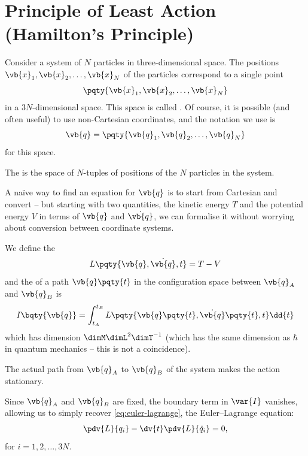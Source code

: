 \section{Principle of Least Action (Hamilton's Principle)}

Consider a system of \(N\) particles in three-dimensional space. The positions \(\vb{x}_1, \vb{x}_2, \ldots, \vb{x}_N\) of the particles correspond to a single point
\[
    \pqty{\vb{x}_1, \vb{x}_2, \ldots, \vb{x}_N}
\]
in a \(3N\)-dimensional space. This space is called . Of course, it is possible (and often useful) to use non-Cartesian coordinates, and the notation we use is
\[
    \vb{q} = \pqty{\vb{q}_1, \vb{q}_2, \ldots, \vb{q}_N}
\]
for this space.

\begin{definition}
    The  is the space of \(N\)-tuples of positions of the \(N\) particles in the system.
\end{definition}

A na\"ive way to find an equation for \(\vb{q}\) is to start from Cartesian and convert -- but starting with two quantities, the kinetic energy \(T\) and the potential energy \(V\) in terms of \(\vb{q}\) and \(\dot{\vb{q}}\), we can formalise it without worrying about conversion between coordinate systems.

\begin{definition}
    We define the 
    \begin{equation}
        \label{eq:lagrangian}%
        L \pqty{\vb{q}, \dot{\vb{q}}, t} = T - V
    \end{equation}
    and the  of a path \(\vb{q}\pqty{t}\) in the configuration space between \(\vb{q}_{A}\) and \(\vb{q}_{B}\) is
    \[
        I \bqty{\vb{q}} = \int_{t_A}^{t_B} L \pqty{\vb{q}\pqty{t}, \dot{\vb{q}} \pqty{t}, t} \dd{t}
    \]
    which has dimension \(\dimM \dimL^2 \dimT^{-1}\) (which has the same dimension as \(\hbar\) in quantum mechanics -- this is not a coincidence).
\end{definition}

\begin{theorem}
    The actual path from \(\vb{q}_A\) to \(\vb{q}_B\) of the system makes the action stationary.
\end{theorem}

Since \(\vb{q}_A\) and \(\vb{q}_B\) are fixed, the boundary term in \(\var{I}\) vanishes, allowing us to simply recover \eqref{eq:euler-lagrange}, the Euler--Lagrange equation:
\[
    \pdv{L}{q_i} - \dv{t} \pdv{L}{\dot{q}_i} = 0,
\]
for \(i = 1, 2, \ldots, 3N\).

